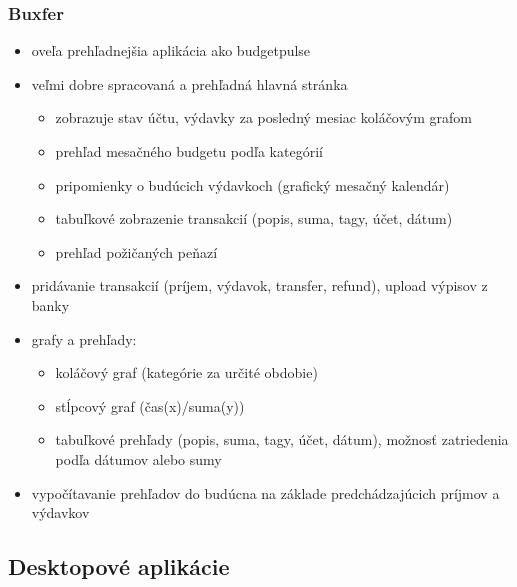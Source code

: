 \documentclass[12pt]{book}
\begin{document}
\subsubsection{Buxfer \cite{Buxfer}\ }
\begin{itemize}
\item{oveľa prehľadnejšia aplikácia ako budgetpulse}
\item{veľmi dobre spracovaná a prehľadná hlavná stránka}
\begin{itemize}
\item{zobrazuje stav účtu, výdavky za posledný mesiac koláčovým grafom}
\item{prehľad mesačného budgetu podľa kategórií}
\item{pripomienky o budúcich výdavkoch (grafický mesačný kalendár)}
\item{tabuľkové zobrazenie transakcií (popis, suma, tagy, účet, dátum)}
\item{prehľad požičaných peňazí}
\end{itemize}
\item{pridávanie transakcií (príjem, výdavok, transfer, refund), upload výpisov z banky}
\item{grafy a prehľady:}
\begin{itemize}
\item{koláčový graf (kategórie za určité obdobie)}
\item{stĺpcový graf (čas(x)/suma(y))}
\item{tabuľkové prehľady (popis, suma, tagy, účet, dátum), možnosť zatriedenia podľa dátumov alebo sumy}
\end{itemize}
\item{vypočítavanie prehľadov do budúcna na základe predchádzajúcich príjmov a výdavkov}
\end{itemize}


\subsection{Desktopové aplikácie}
\end{document}
